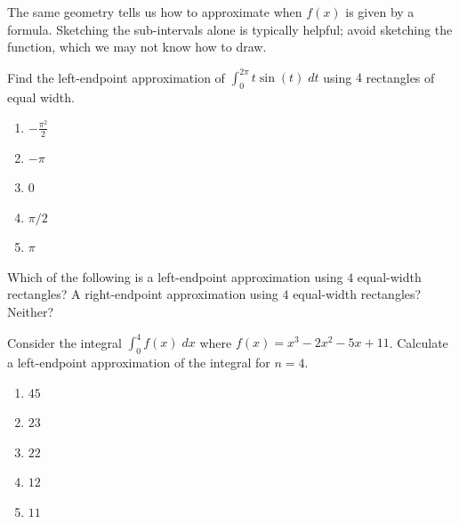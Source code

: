 \documentclass[../main.tex]{subfiles}
\begin{document}
The same geometry tells us how to approximate when \(f(x)\) is given by a formula. Sketching the sub-intervals alone is typically helpful; avoid sketching the function, which we may not know how to draw. 
\begin{example}
  Find the left-endpoint approximation of \(\int_{0}^{2\pi} t \sin(t) \;dt\) using \(4\) rectangles of equal width.

  \begin{enumerate}[label=\Alph*.]
    \item \(-\frac{\pi^{2}}{2}\)
    \item \(-\pi\)
    \item \(0\)
    \item \(\pi/2\)
    \item \(\pi\)
  \end{enumerate}

  \blanks*
\end{example}
\clearpage

\begin{exercise} \label{ex:riemann-sketch-five}
  Which of the following is a left-endpoint approximation using \(4\) equal-width rectangles? A right-endpoint approximation using \(4\) equal-width rectangles? Neither?

  \begin{center}
    
    \qquad
    
    
    \bigskip

    
    \qquad
    
  \end{center}
\end{exercise}

\begin{exercise}
  Consider the integral \(\int_{0}^{4} f(x) \;dx\) where \(f(x) = x^{3} - 2x^{2} - 5x + 11\).  Calculate a left-endpoint approximation of the integral for \(n=4\).

\begin{enumerate}[label=\Alph*.]
    \item \(45\)
    \item \(23\)
    \item \(22\)
    \item \(12\)
    \item \(11\)
  \end{enumerate}

  \blanks*
\end{exercise}
\clearpage
\end{document}
